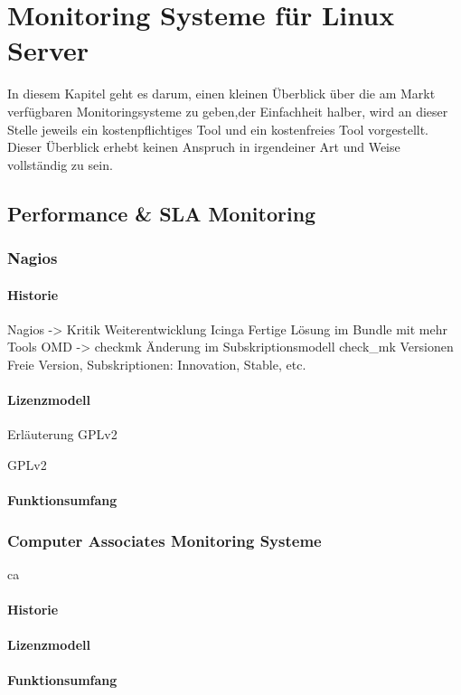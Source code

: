 \documentclass[12pt,a4paper,parskip]{scrreprt}
\begin{document}
	\chapter{Monitoring Systeme für Linux Server}
	In diesem Kapitel geht es darum, einen kleinen Überblick über die am Markt verfügbaren Monitoringsysteme zu geben,der Einfachheit halber, wird an dieser Stelle jeweils ein kostenpflichtiges Tool und ein kostenfreies Tool vorgestellt. Dieser Überblick erhebt keinen Anspruch in irgendeiner Art und Weise vollständig zu sein.
	\section{Performance \& SLA Monitoring}
	\subsection{Nagios}
	\subsubsection{Historie}
	Nagios -> Kritik Weiterentwicklung
	Icinga
	Fertige Lösung im Bundle mit mehr Tools
	OMD -> checkmk Änderung im Subskriptionsmodell
	check_mk Versionen Freie Version, Subskriptionen: Innovation, Stable, etc.
	
	\subsubsection{Lizenzmodell}
	Erläuterung GPLv2
	
	\gls{GPLv2}
	\subsubsection{Funktionsumfang}
	
	\subsection{Computer Associates Monitoring Systeme}
	
	\gls{ca}
	
	\subsubsection{Historie}
	\subsubsection{Lizenzmodell}
	\subsubsection{Funktionsumfang}
\end{document}

